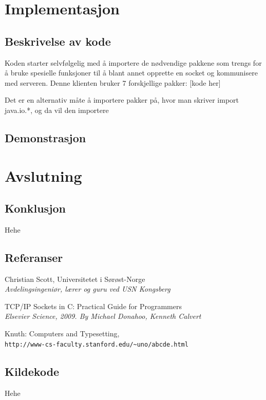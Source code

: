 \documentclass{article}
\begin{document}
	\newpage
	\section{Implementasjon}
		\subsection{Beskrivelse av kode}
			Koden starter selvfølgelig med å importere de nødvendige pakkene som trengs for å bruke spesielle funksjoner til å blant annet opprette en socket og kommunisere med serveren. Denne klienten bruker 7 forskjellige pakker:
			[kode her]

			Det er en alternativ måte å importere pakker på, hvor man skriver import java.io.*, og da vil den importere
		\subsection{Demonstrasjon}

	\newpage
	\section{Avslutning}
		\subsection{Konklusjon}
			Hehe

		\newpage
		\subsection{Referanser}
			\renewcommand{\section}[2]{}
			\begin{thebibliography}{50}
					Christian Scott, Universitetet i Sørøst-Norge\\
					\textit{Avdelingsingeniør, lærer og guru ved USN Kongsberg}

					TCP/IP Sockets in C: Practical Guide for Programmers\\
					\textit{Elsevier Science, 2009. By Michael Donahoo, Kenneth Calvert}

					Knuth: Computers and Typesetting,
					\\\texttt{http://www-cs-faculty.stanford.edu/\~{}uno/abcde.html}
			\end{thebibliography}
		
		\newpage
		\subsection{Kildekode}
			Hehe
\end{document}
